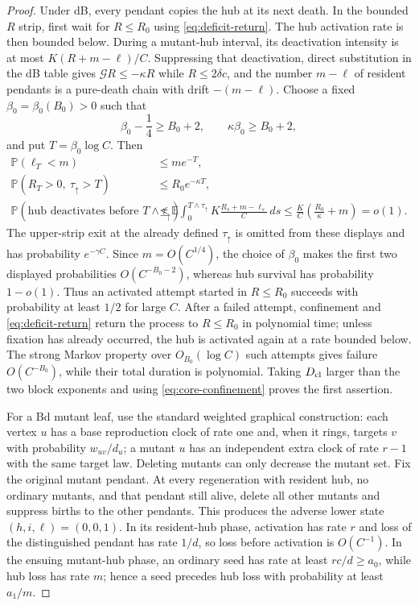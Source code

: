 \documentclass[11pt]{article}
\theoremstyle{definition}
\theoremstyle{remark}
\newcommand{\Prob}{\mathbb P}
\begin{document}
\begin{proof}
Under dB, every pendant copies the hub at its next death.  In the bounded
$R$ strip, first wait for $R\leq R_0$ using
\eqref{eq:deficit-return}.  The hub activation rate is then bounded below.
During a mutant-hub interval, its deactivation intensity is at most
$K(R+m-\ell)/C$.  Suppressing that deactivation, direct substitution in the
dB table gives $\mathcal G R\leq-\kappa R$ while $R\leq2\delta c$, and the
number $m-\ell$ of resident pendants is a pure-death chain with drift
$-(m-\ell)$.  Choose a fixed $\beta_0=\beta_0(B_0)>0$ such that
\[
 \beta_0-\frac14\geq B_0+2,
 \qquad
 \kappa\beta_0\geq B_0+2,
\]
and put $T=\beta_0\log C$.  Then
\begin{align*}
 \Prob(\ell_T<m)&\leq me^{-T},\\
 \Prob(R_T>0,\ \tau_\uparrow>T)
 &\leq R_0e^{-\kappa T},\\
 \Prob(\text{hub deactivates before }T\wedge\tau_\uparrow)
 &\leq \mathbb E\int_0^{T\wedge\tau_\uparrow}
 K\frac{R_s+m-\ell_s}{C}\,ds
   \leq\frac K C\left(\frac{R_0}{\kappa}+m\right)=o(1).
\end{align*}
The upper-strip exit at the already defined $\tau_\uparrow$ is omitted from
these displays and has probability $e^{-\gamma C}$.  Since $m=O(C^{1/4})$,
the choice of $\beta_0$ makes the first two displayed probabilities
$O(C^{-B_0-2})$,
whereas hub survival has probability $1-o(1)$.  Thus an activated attempt
started in $R\leq R_0$ succeeds with
probability at least $1/2$ for large $C$.  After a failed attempt, confinement
and \eqref{eq:deficit-return} return the process to $R\leq R_0$ in
polynomial time; unless fixation has already occurred, the hub is activated
again at a rate bounded below.  The strong Markov property over
$O_{B_0}(\log C)$ such attempts gives failure $O(C^{-B_0})$, while their
total duration is polynomial.  Taking $D_{\rm cl}$ larger than the two block
exponents and using \eqref{eq:core-confinement} proves the first assertion.

For a Bd mutant leaf, use the standard weighted graphical construction: each
vertex $u$ has a base reproduction clock of rate one and, when it rings,
targets $v$ with probability $w_{uv}/d_u$; a mutant $u$ has an independent
extra clock of rate $r-1$ with the same target law.  Deleting mutants can
only decrease the mutant set.  Fix the original mutant pendant.  At every
regeneration with resident hub, no ordinary mutants, and that pendant still
alive, delete all other mutants and suppress births to the other pendants.
This produces the adverse lower state $(h,i,\ell)=(0,0,1)$.
In its resident-hub phase, activation has rate $r$ and loss of the
distinguished pendant has rate $1/d$, so loss before activation is
$O(C^{-1})$.  In the ensuing mutant-hub phase, an ordinary seed has rate at
least $rc/d\geq a_0$, while hub loss has rate $m$; hence a seed precedes hub
loss with probability at least $a_1/m$.


\end{proof}
\end{document}
